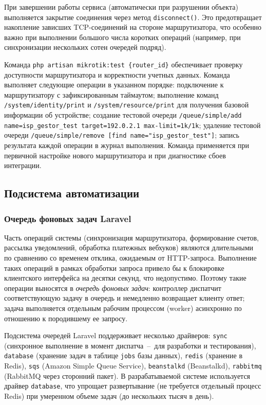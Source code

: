 При завершении работы сервиса (автоматически при разрушении объекта) выполняется закрытие соединения через метод \texttt{disconnect()}. Это предотвращает накопление зависших TCP-соединений на стороне маршрутизатора, что особенно важно при выполнении большого числа коротких операций (например, при синхронизации нескольких сотен очередей подряд).

Команда \texttt{php artisan mikrotik:test \{router\_id\}} обеспечивает проверку доступности маршрутизатора и корректности учетных данных. Команда выполняет следующие операции в указанном порядке: подключение к маршрутизатору с зафиксированным таймаутом; выполнение команд \texttt{/system/identity/print} и \texttt{/system/resource/print} для получения базовой информации об устройстве; создание тестовой очереди \texttt{/queue/simple/add name=isp\_gestor\_test target=192.0.2.1 max-limit=1k/1k}; удаление тестовой очереди \texttt{/queue/simple/remove [find name="isp\_gestor\_test"]}; запись результата каждой операции в журнал выполнения. Команда применяется при первичной настройке нового маршрутизатора и при диагностике сбоев интеграции.

\subsection{Подсистема автоматизации}

\subsubsection{Очередь фоновых задач Laravel}

Часть операций системы (синхронизация маршрутизатора, формирование счетов, рассылка уведомлений, обработка платежных вебхуков) являются длительными по сравнению со временем отклика, ожидаемым от HTTP-запроса. Выполнение таких операций в рамках обработки запроса привело бы к блокировке клиентского интерфейса на десятки секунд, что недопустимо. Поэтому такие операции выносятся в \emph{очередь фоновых задач}: контроллер диспатчит соответствующую задачу в очередь и немедленно возвращает клиенту ответ; задача выполняется отдельным рабочим процессом (worker) асинхронно по отношению к породившему ее запросу.

Подсистема очередей Laravel поддерживает несколько драйверов: \texttt{sync} (синхронное выполнение в момент диспатча~--~для разработки и тестирования), \texttt{database} (хранение задач в таблице \texttt{jobs} базы данных), \texttt{redis} (хранение в Redis), \texttt{sqs} (Amazon Simple Queue Service), \texttt{beanstalkd} (Beanstalkd), \texttt{rabbitmq} (RabbitMQ через сторонний пакет). В разрабатываемой системе используется драйвер \texttt{database}, что упрощает развертывание (не требуется отдельный процесс Redis) при умеренном объеме задач (до нескольких тысяч в день).

